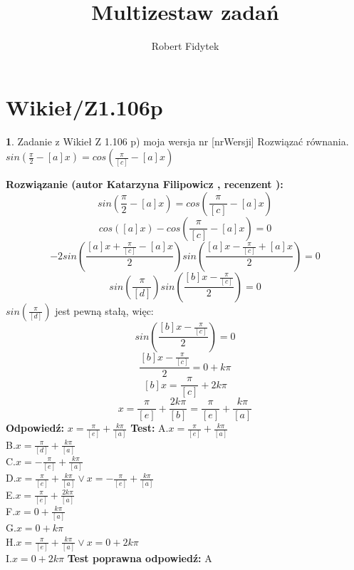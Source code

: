 \documentclass[12pt, a4paper]{article}
\title{Multizestaw zadań}
\author{Robert Fidytek}
\date{}
\theoremstyle{definition} %
\newtheorem{zad}{}
\newcommand{\kategoria}[1]{\section{#1}} %
\newcommand{\zadStart}[1]{\begin{zad}#1\newline} %
\newcommand{\zadStop}{\end{zad}}   %
\newcommand{\rozwStart}[2]{\noindent \textbf{Rozwiązanie (autor #1 , recenzent #2): }\newline} %
\newcommand{\rozwStop}{\newline}                                            %
\newcommand{\odpStart}{\noindent \textbf{Odpowiedź:}\newline}    %
\newcommand{\odpStop}{\newline}                                             %
\newcommand{\testStart}{\noindent \textbf{Test:}\newline} %
\newcommand{\testStop}{\newline} %
\newcommand{\kluczStart}{\noindent \textbf{Test poprawna odpowiedź:}\newline} %
\newcommand{\kluczStop}{\newline} %
\begin{document}
\maketitle


\kategoria{Wikieł/Z1.106p}
\zadStart{Zadanie z Wikieł Z 1.106 p) moja wersja nr [nrWersji]}
Rozwiązać równania.\\
 $sin\left(\frac{\pi}{2}-[a]x\right)=cos\left(\frac{\pi}{[c]}-[a]x\right)$
\zadStop
\rozwStart{Katarzyna Filipowicz}{}
$$
sin\left(\frac{\pi}{2}-[a]x\right)=cos\left(\frac{\pi}{[c]}-[a]x\right)
$$ $$
cos\left([a]x\right)-cos\left(\frac{\pi}{[c]}-[a]x\right)=0
$$  $$
-2sin\left(\frac{[a]x+\frac{\pi}{[c]}-[a]x}{2}\right)sin\left(\frac{[a]x-\frac{\pi}{[c]}+[a]x}{2}\right)=0
$$ $$
sin\left(\frac{\pi}{[d]}\right)sin\left(\frac{[b]x-\frac{\pi}{[c]}}{2}\right)=0
$$ 
$sin\left(\frac{\pi}{[d]}\right)$ jest pewną stałą, więc:
 $$
sin\left(\frac{[b]x-\frac{\pi}{[c]}}{2}\right)=0
$$ $$
\frac{[b]x-\frac{\pi}{[c]}}{2}=0+k\pi
$$ $$
 [b]x=\frac{\pi}{[c]}+2k\pi
$$ $$
x=\frac{\pi}{[e]}+\frac{2k\pi}{[b]}=\frac{\pi}{[e]}+\frac{k\pi}{[a]}
$$
\rozwStop
\odpStart
$x=\frac{\pi}{[e]}+\frac{k\pi}{[a]}$
\odpStop
\testStart
A.$x=\frac{\pi}{[e]}+\frac{k\pi}{[a]}$\\
B.$x=\frac{\pi}{[d]}+\frac{k\pi}{[a]}$\\
C.$x=-\frac{\pi}{[e]}+\frac{k\pi}{[a]}$\\
D.$x=\frac{\pi}{[e]}+\frac{k\pi}{[a]}  \vee x=-\frac{\pi}{[e]}+\frac{k\pi}{[a]}$\\
E.$x=\frac{\pi}{[e]}+\frac{2k\pi}{[a]}$\\
F.$x=0+\frac{k\pi}{[a]}$\\
G.$x=0+k\pi$\\
H.$x=\frac{\pi}{[e]}+\frac{k\pi}{[a]}\vee x=0+2k\pi $\\
I.$x=0+2k\pi $
\testStop
\kluczStart
A
\kluczStop
\end{document}
